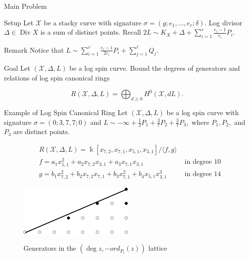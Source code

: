 \documentclass{beamer}
\theoremstyle{remark}
\newcommand \sx{{\mathscr X}}
\DeclareMathOperator\di{Div}
\newcommand{\halfcan}{L}
\newcommand\Bk{{\Bbbk}}
\begin{document}
\begin{frame}{Main Problem}
\begin{block}{Setup}
Let $\sx$ be a stacky curve with
signature $\sigma = (g; e_1, \ldots, e_r; \delta)$.
Log divisor $\Delta \in \di X$ is a sum of distinct points.
Recall $2 \halfcan \sim K_X + \Delta + \sum_{i = 1}^{r}
\frac{e_i - 1}{e_i} P_i$.
\end{block}

\begin{block}{Remark}
Notice that $\halfcan \sim \sum_{i = 1}^{r} \frac{e_i - 1}{2e_i} P_i
+ \sum_{j = 1}^{\ell} Q_j$.
\end{block}

\begin{block}{Goal}
Let $(\sx, \Delta, \halfcan)$ be a log spin curve.
Bound the degrees of generators and relations of log spin
canonical rings

\[
	R(\sx, \Delta, \halfcan) = \bigoplus_{d \geq 0} H^0(\sx, d \halfcan).
\]
\end{block}
\end{frame}

\begin{frame}{Example of Log Spin Canonical Ring}
Let $(\sx, \Delta, \halfcan)$ be a log spin curve with signature $\sigma =
(0; 3, 7, 7; 0)$ and $\halfcan \sim -\infty + \frac{1}{3} P_1 +
\frac{3}{7} P_2 + \frac{3}{7} P_3,$ where $P_1, P_2,$ and $P_3$ are
distinct points.

\vspace*{-0.5cm}
\begin{align*}
	&R(\sx, \Delta, \halfcan) = \Bk[x_{7, 2}, x_{7, 1}, x_{5, 1}, x_{3, 1}] / \langle f, g \rangle \\
	&f = a_1 x_{5, 1}^2 + a_2 x_{7, 2} x_{3, 1} + a_3 x_{7, 1} x_{3, 1} 
	&\text{ in degree $10$} \\
	&g = b_1 x_{7, 2}^2 + b_2 x_{7, 2} x_{7, 1} + b_3 x_{7, 1}^2
	+ b_4 x_{5, 1} x_{3, 1}^3  &\text{ in degree $14$}
\end{align*}

\begin{figure}
\includegraphics{pics/spin-377-pic-pics.pdf} \\
\caption{Generators in the $(\deg z, -ord_{P_i}(z))$ lattice}
\end{figure}

\end{frame}
\end{document}
